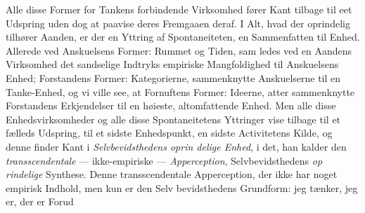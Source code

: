 \documentclass[12pt,a4paper]{book}
\begin{document}
Alle disse Former for Tankens forbindende Virksomhed
fører Kant tilbage til eet Udspring uden dog at paavise deres
Fremgaaen deraf. I Alt, hvad der oprindelig tilhører Aanden,
er der en Yttring af Spontaneiteten, en Sammenfatten til Enhed.
Allerede ved Anskuelsens Former: Rummet og Tiden, sam\-%
ledes ved en Aandens Virksomhed det sandselige Indtryks
empiriske Mangfoldighed til Anskuelsens Enhed; Forstandens
Former: Kategorierne, sammenknytte Anskuelserne til en
Tanke-Enhed, og vi ville see, at Fornuftens Former: Ideerne,
atter sammenknytte Forstandens Erkjendelser til en høieste,
altomfattende Enhed. Men alle disse Enhedsvirksomheder og
alle disse Spontaneitetens Yttringer vise tilbage til et fælleds
Udspring, til et sidste Enhedspunkt, en sidste Activitetens
Kilde, og denne finder Kant i \emph{Selvbevidsthedens oprin\-%
delige Enhed}, i det, han kalder den \emph{transscendentale}
--- ikke-empiriske --- \emph{Apperception}, Selvbevidsthedens \emph{op\-%
rindelige} Synthese. Denne transscendentale Apperception,
der ikke har noget empirisk Indhold, men kun er den Selv\-%
bevidsthedens Grundform: jeg tænker, jeg er, der er Forud\-%
\end{document}
